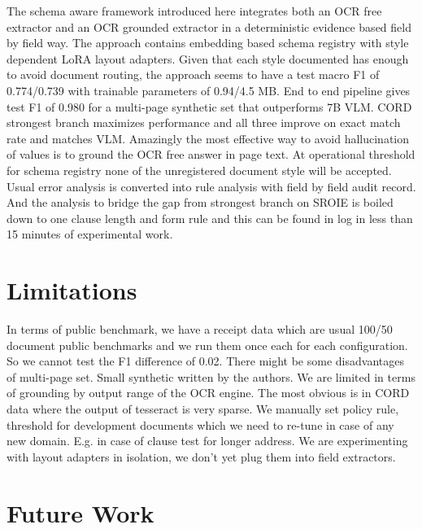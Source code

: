 \documentclass[conference]{IEEEtran}
\begin{document}
The schema aware framework introduced here integrates both an OCR free extractor and an OCR grounded extractor in a deterministic evidence based field by field way. The approach contains embedding based schema registry with style dependent LoRA layout adapters. Given that each style documented has enough to avoid document routing, the approach seems to have a test macro F1 of 0.774/0.739 with trainable parameters of 0.94/4.5 MB. End to end pipeline gives test F1 of 0.980 for a multi-page synthetic set that outperforms 7B VLM. CORD strongest branch maximizes performance and all three improve on exact match rate and matches VLM. Amazingly the most effective way to avoid hallucination of values is to ground the OCR free answer in page text. At operational threshold for schema registry none of the unregistered document style will be accepted. Usual error analysis is converted into rule analysis with field by field audit record. And the analysis to bridge the gap from strongest branch on SROIE is boiled down to one clause length and form rule and this can be found in log in less than 15 minutes of experimental work.
\section{Limitations}
\label{sec:limitations}

In terms of public benchmark, we have a receipt data which are usual 100/50 document public benchmarks and we run them once each for each configuration. So we cannot test the F1 difference of 0.02. There might be some disadvantages of multi-page set. Small synthetic written by the authors. We are limited in terms of grounding by output range of the OCR engine. The most obvious is in CORD data where the output of tesseract is very sparse. We manually set policy rule, threshold for development documents which we need to re-tune in case of any new domain. E.g. in case of clause test for longer address. We are experimenting with layout adapters in isolation, we don't yet plug them into field extractors.


\section{Future Work}
\label{sec:future}
\end{document}
